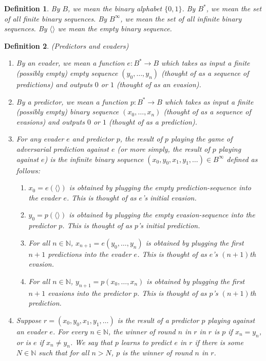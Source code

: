 \documentclass{article}
\newtheorem{definition}{Definition}
\begin{document}
\begin{definition}
By $B$, we mean the binary alphabet $\{0,1\}$. By $B^*$, we mean the set of all
finite binary sequences. By $B^\infty$, we mean the set of all infinite binary
sequences. By $\langle\rangle$ we mean the empty binary sequence.
\end{definition}

\begin{definition}
    (Predictors and evaders)
    \begin{enumerate}
        \item
        By an \emph{evader}, we mean a function $e:B^*\to B$
        which takes as input a finite (possibly empty) empty sequence $(y_0,\ldots,y_n)$
        (thought of as a sequence of \emph{predictions})
        and outputs $0$ or $1$ (thought of as an \emph{evasion}).
        \item
        By a \emph{predictor}, we mean a function $p:B^*\to B$
        which takes as input a finite (possibly empty) binary sequence $(x_0,\ldots,x_n)$
        (thought of as a sequence of \emph{evasions})
        and outputs $0$ or $1$ (thought of as a \emph{prediction}).
        \item
        For any evader $e$ and predictor $p$, the \emph{result of $p$ playing the
        game of adversarial prediction against $e$} (or more simply, the \emph{result of
        $p$ playing against $e$}) is the infinite binary sequence
        $(x_0,y_0,x_1,y_1,\ldots)\in B^\infty$
        defined as follows:
        \begin{enumerate}
            \item
            $x_0=e(\langle\rangle)$ is obtained by plugging the empty prediction-sequence into
            the evader $e$. This is thought of as $e$'s initial evasion.
            \item
            $y_0=p(\langle\rangle)$ is obtained by plugging the empty evasion-sequence into
            the predictor $p$. This is thought of as $p$'s initial prediction.
            \item
            For all $n\in\mathbb N$,
            $x_{n+1}=e(y_0,\ldots,y_n)$ is obtained by plugging the first $n+1$ predictions
            into the evader $e$. This is thought of as $e$'s $(n+1)$th evasion.
            \item
            For all $n\in\mathbb N$,
            $y_{n+1}=p(x_0,\ldots,x_n)$ is obtained by plugging the first $n+1$ evasions into
            the predictor $p$. This is thought of as $p$'s $(n+1)$th prediction.
        \end{enumerate}
        \item
        Suppose $r=(x_0,y_0,x_1,y_1,\ldots)$ is the result of a predictor $p$ playing
        against an evader $e$. For every $n\in\mathbb N$, the \emph{winner of round $n$ in $r$}
        in $r$ is $p$ if $x_n=y_n$, or is $e$ if $x_n\neq y_n$.
        We say that \emph{$p$ learns to predict $e$ in $r$} if there is some $N\in\mathbb N$
        such that for all $n>N$, $p$ is the winner of round $n$ in $r$.
    \end{enumerate}
\end{definition}



\end{document}

